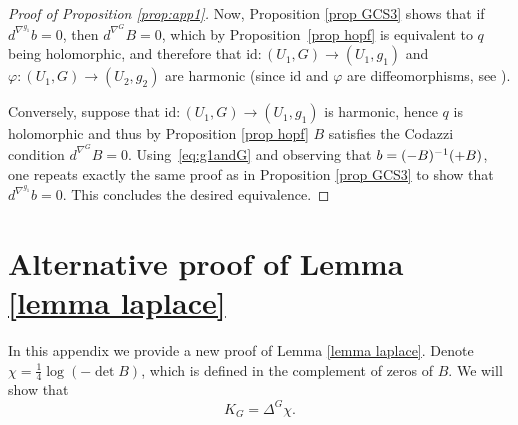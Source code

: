 \documentclass[11pt]{article}
\makeatletter
\DeclareRobustCommand{\mathbbm}[1]{\csname jepbb@#1\endcsname}
\theoremstyle{definition}
\makeatother
\begin{document}
\begin{proof}[Proof of Proposition \ref{prop:app1}]
Now, Proposition \ref{prop GCS3} shows that if $d^{\nabla^{g_1}}\!b=0$, then $d^{\nabla^{G}}\!B=0$, which by Proposition~\ref{prop hopf} is equivalent to $q$ being holomorphic, and therefore that \hbox{$\mathrm{id}:(U_1,G)\!\to\! (U_1,g_1)$} and $\varphi:(U_1,G)\to (U_2,g_2)$ are harmonic (since $\mathrm{id}$ and $\varphi$ are diffeomorphisms, see \cite[\S 9]{zbMATH03608406}).

Conversely, suppose that $\mathrm{id}:(U_1,G)\to (U_1,g_1)$ is harmonic, hence $q$ is holomorphic and thus by Proposition \ref{prop hopf} $B$ satisfies the Codazzi condition $d^{\nabla^{G}}\!B=0$. Using~\eqref{eq:g1andG} and observing that $b=(\mathbbm 1-B)^{-1}(\mathbbm 1+B)$, one repeats exactly the same proof as in Proposition \ref{prop GCS3} to show that $d^{\nabla^{g_1}}\!b=0$. This concludes the desired equivalence.
\end{proof}

\section{Alternative proof of Lemma \ref{lemma laplace}}
\label{app:alternative}

In this appendix we provide a new proof of Lemma \ref{lemma laplace}. Denote $\chi=\tfrac14\log(-\det B)$, which is defined in the complement of zeros of $B$. We will show that
\begin{equation}\label{eq:curvature laplacian}
K_G=\Delta^G\chi.
\end{equation}
\end{document}
